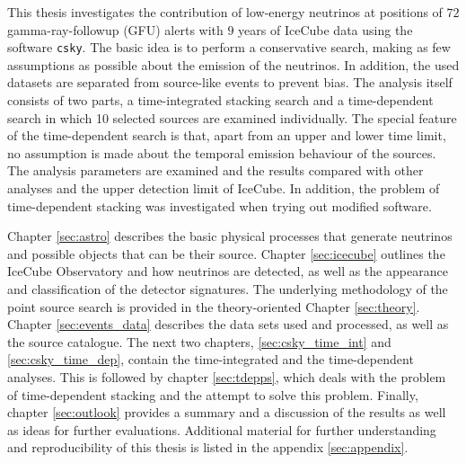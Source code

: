 This thesis investigates the contribution of low-energy neutrinos at positions of $\num{72}$ gamma-ray-followup (GFU) alerts with $\num{9}$ years of IceCube data using the software \texttt{csky}.
The basic idea is to perform a conservative search, making as few assumptions as possible about the emission of the neutrinos.
In addition, the used datasets are separated from source-like events to prevent bias.
The analysis itself consists of two parts, a time-integrated stacking search and a time-dependent search in which 10 selected sources are examined individually.
The special feature of the time-dependent search is that, apart from an upper and lower time limit, no assumption is made about the temporal emission behaviour of the sources.
The analysis parameters are examined and the results compared with other analyses and the upper detection limit of IceCube.
In addition, the problem of time-dependent stacking was investigated when trying out modified software.

Chapter \ref{sec:astro} describes the basic physical processes that generate neutrinos and possible objects that can be their source.
Chapter \ref{sec:icecube} outlines the IceCube Observatory and how neutrinos are detected, as well as the appearance and classification of the detector signatures.
The underlying methodology of the point source search is provided in the theory-oriented Chapter \ref{sec:theory}.
Chapter \ref{sec:events_data} describes the data sets used and processed, as well as the source catalogue.
The next two chapters, \ref{sec:csky_time_int} and \ref{sec:csky_time_dep}, contain the time-integrated and the time-dependent analyses.
This is followed by chapter \ref{sec:tdepps}, which deals with the problem of time-dependent stacking and the attempt to solve this problem.
Finally, chapter \ref{sec:outlook} provides a summary and a discussion of the results as well as ideas for further evaluations.
Additional material for further understanding and reproducibility of this thesis is listed in the appendix \ref{sec:appendix}.
